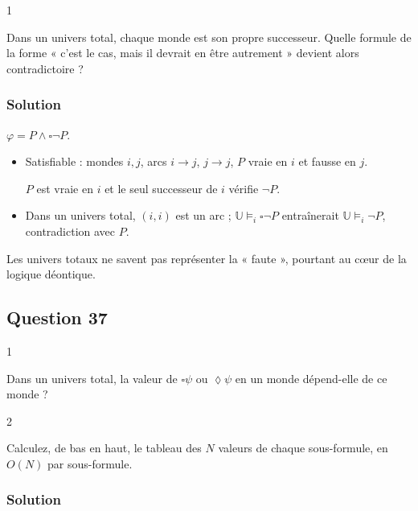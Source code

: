 \documentclass[11pt,a4paper]{article}
\providecommand{\Box}{\square}
\providecommand{\Diamond}{\lozenge}
\begin{document}
\begin{indication}{1}

Dans un univers total, chaque monde est son propre successeur. Quelle formule de la forme « c'est le cas, mais il devrait en être autrement » devient alors contradictoire ?

\end{indication}

\hypertarget{solution-35}{%
\subsubsection{Solution}\label{solution-35}}

\(\varphi=P\wedge\Box\neg P\).

\begin{itemize}
\item
  Satisfiable : mondes \(i,j\), arcs \(i\to j\), \(j\to j\), \(P\) vraie en \(i\) et fausse en \(j\).

  \(P\) est vraie en \(i\) et le seul successeur de \(i\) vérifie \(\neg P\).
\item
  Dans un univers total, \((i,i)\) est un arc ; \(\mathbb U\models_i\Box\neg P\) entraînerait \(\mathbb U\models_i\neg P\), contradiction avec \(P\).
\end{itemize}

Les univers totaux ne savent pas représenter la « faute », pourtant au cœur de la logique déontique.

\hypertarget{question-37}{%
\subsection{Question 37}\label{question-37}}

\begin{indication}{1}

Dans un univers total, la valeur de \(\Box\psi\) ou \(\Diamond\psi\) en un monde dépend-elle de ce monde ?

\end{indication}

\begin{indication}{2}

Calculez, de bas en haut, le tableau des \(N\) valeurs de chaque sous-formule, en \(O(N)\) par sous-formule.

\end{indication}

\hypertarget{solution-36}{%
\subsubsection{Solution}\label{solution-36}}
\end{document}
